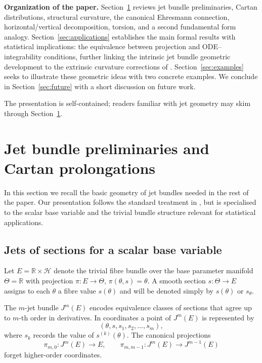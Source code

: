 \documentclass[3p,times]{elsarticle}
\begin{document}
\medskip
\noindent\textbf{Organization of the paper.}
Section~\ref{sec:prelim} reviews jet bundle preliminaries, Cartan distributions, structural curvature, the canonical Ehresmann connection,
horizontal/vertical decomposition, torsion, and a second fundamental form analogy. 
Section~\ref{sec:applications} establishes the main formal results with statistical implications: the  equivalence
between projection and ODE--integrability conditions, further linking the intrinsic jet bundle geometric development to the extrinsic curvature corrections of
\cite{SRK,srkvector}.  
Section~\ref{sec:examples} seeks to illustrate these geometric ideas with two concrete examples.  
We conclude in Section~\ref{sec:future} with a short discussion on future work.  

\medskip
The presentation is self-contained; readers familiar with jet geometry may skim through
Section~\ref{sec:prelim}.


\section{Jet bundle preliminaries and Cartan prolongations}
\label{sec:prelim}

In this section we recall the basic geometry of jet bundles needed in the rest of the paper.  
Our presentation follows the standard treatment in \cite{Saunders}, but is specialised to the scalar base
variable and the trivial bundle structure relevant for statistical applications.  

\subsection{Jets of sections for a scalar base variable}

Let $E = \mathbb{R} \times \mathcal{H}$ denote the trivial fibre bundle over the base parameter manifold 
$\Theta = \mathbb{R}$ with projection $\pi:E\to \Theta$, $\pi(\theta,s)=\theta$.  
A smooth section $s:\Theta\to E$ assigns to each $\theta$ a fibre value $s(\theta)$ and will be denoted
simply by $s(\theta)$ or $s_\theta$.  

The $m$-jet bundle $J^{m}(E)$ encodes equivalence classes of sections that agree up to $m$-th order in derivatives.
In coordinates a point of $J^{m}(E)$ is represented by
\[
 (\theta, s, s_1, s_2,\ldots,s_m),
\]
where $s_k$ records the value of 
$s^{(k)}(\theta)$.  
The canonical projections
\[
\pi_{m,0}:J^{m}(E)\to E,\qquad
\pi_{m,m-1}:J^{m}(E)\to J^{m-1}(E)
\]
forget higher-order coordinates.
\end{document}

